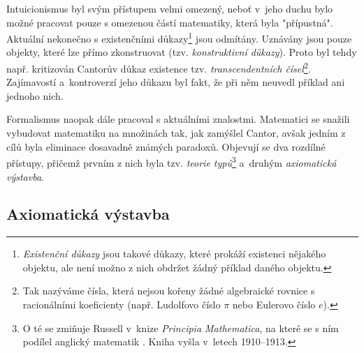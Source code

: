 Intuicionismus byl svým přístupem velmi omezený, neboť v~jeho duchu bylo možné pracovat pouze s omezenou částí matematiky, která byla "přípustná". Aktuální nekonečno s existenčními důkazy\footnote{\emph{Existenční důkazy} jsou takové důkazy, které prokáží existenci nějakého objektu, ale není možno z nich obdržet žádný příklad daného objektu.} jsou odmítány. Uznávány jsou pouze objekty, které lze přímo zkonstruovat (tzv. \emph{konstruktivní důkazy}). Proto byl tehdy např. kritizován Cantorův důkaz existence tzv. \emph{transcendentních čísel}\footnote{Tak nazýváme čísla, která nejsou kořeny žádné algebraické rovnice s racionálními koeficienty (např. Ludolfovo číslo $\pi$ nebo Eulerovo číslo $e$).}. Zajímavostí a~kontroverzí jeho důkazu byl fakt, že při něm neuvedl příklad ani jednoho nich.\par
Formalismus naopak dále pracoval s aktuálními znalostmi. Matematici se snažili vybudovat matematiku na množinách tak, jak zamýšlel Cantor, avšak jedním z cílů byla eliminace dosavadně známých paradoxů. Objevují se dva rozdílné přístupy, přičemž prvním z nich byla tzv. \emph{teorie typů}\footnote{O té se zmiňuje Russell v~knize \emph{Principia Mathematica}, na které se s ním podílel anglický matematik . Kniha vyšla v~letech 1910--1913.} a~druhým \emph{axiomatická výstavba}.\par

\subsection{Axiomatická výstavba}\label{subsec:axiomaticka_vystavba}

